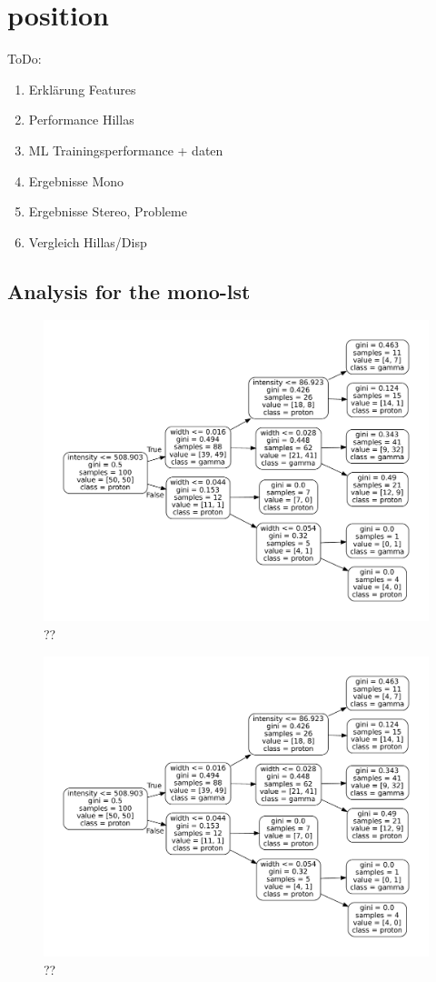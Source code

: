 \section{position}\label{position}

ToDo:
\begin{enumerate}[nosep]
    \item Erklärung Features
    \item Performance Hillas
    \item ML Trainingsperformance + daten
    \item Ergebnisse Mono
    \item Ergebnisse Stereo, Probleme
    \item Vergleich Hillas/Disp
\end{enumerate}

\subsection{Analysis for the mono-lst}
\begin{figure}
    \includegraphics[width=.8\textwidth]{Plots/decision_tree.pdf}
    \caption{??}
    \label{fig:??}
\end{figure}

\begin{figure}
    \includegraphics[width=.8\textwidth]{Plots/decision_tree.pdf}
    \caption{??}
    \label{fig:??}
\end{figure}

